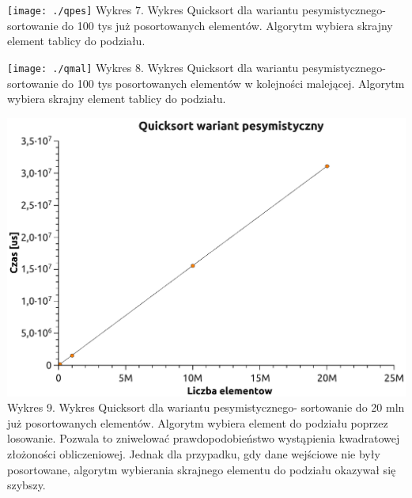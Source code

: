 \documentclass[12pt,a4paper]{article}
\begin{document}
\texttt{[image: ./qpes]} \newline
Wykres 7. Wykres Quicksort dla wariantu pesymistycznego- sortowanie do 100 tys już posortowanych elementów. Algorytm wybiera skrajny element tablicy do podziału. \newpage

\texttt{[image: ./qmal]} \newline
Wykres 8. Wykres Quicksort dla wariantu pesymistycznego- sortowanie do 100 tys posortowanych elementów w kolejności malejącej. Algorytm wybiera skrajny element tablicy do podziału. \newpage

\includegraphics[scale=0.6]{./qpn} \newline
Wykres 9. Wykres Quicksort dla wariantu pesymistycznego- sortowanie do 20 mln już posortowanych elementów. Algorytm wybiera element do podziału poprzez losowanie. Pozwala to zniwelować prawdopodobieństwo wystąpienia kwadratowej złożoności obliczeniowej. Jednak dla przypadku, gdy dane wejściowe nie były posortowane, algorytm wybierania skrajnego elementu do podziału okazywał się szybszy.
\end{document}

